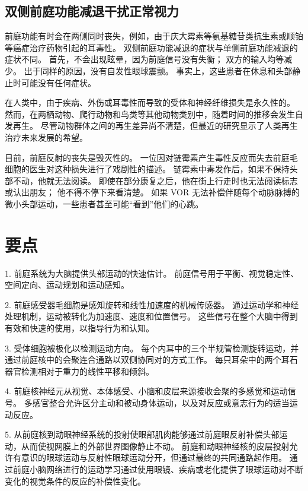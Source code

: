 \subsection{双侧前庭功能减退干扰正常视力}

前庭功能有时会在两侧同时丧失，例如，由于庆大霉素等氨基糖苷类抗生素或顺铂等癌症治疗药物引起的耳毒性。 双侧前庭功能减退的症状与单侧前庭功能减退的症状不同。 首先，不会出现眩晕，因为前庭信号没有失衡； 双方的输入均等减少。 出于同样的原因，没有自发性眼球震颤。 事实上，这些患者在休息和头部静止时可能没有任何症状。

在人类中，由于疾病、外伤或耳毒性而导致的受体和神经纤维损失是永久性的。 然而，在两栖动物、爬行动物和鸟类等其他动物类别中，随着时间的推移会发生自发再生。 尽管动物群体之间的再生差异尚不清楚，但最近的研究显示了人类再生治疗未来发展的希望。

目前，前庭反射的丧失是毁灭性的。 一位因对链霉素产生毒性反应而失去前庭毛细胞的医生对这种损失进行了戏剧性的描述。 链霉素中毒发作后，如果不保持头部不动，他就无法阅读。 即使在部分康复之后，他在街上行走时也无法阅读标志或认出朋友； 他不得不停下来看清楚。 如果 VOR 无法补偿伴随每个动脉脉搏的微小头部运动，一些患者甚至可能“看到”他们的心跳。

\section{要点}

1. 前庭系统为大脑提供头部运动的快速估计。 前庭信号用于平衡、视觉稳定性、空间定向、运动规划和运动感知。 

2. 前庭感受器毛细胞是感知旋转和线性加速度的机械传感器。 通过运动学和神经处理机制，运动被转化为加速度、速度和位置信号。 这些信号在整个大脑中得到有效和快速的使用，以指导行为和认知。 

3. 受体细胞被极化以检测运动方向。 每个内耳中的三个半规管检测旋转运动，并通过前庭核中的会聚连合通路以双侧协同对的方式工作。 每只耳朵中的两个耳石器官检测相对于重力的线性平移和倾斜。 

4. 前庭核神经元从视觉、本体感受、小脑和皮层来源接收会聚的多感觉和运动信号。 多感官整合允许区分主动和被动身体运动，以及对反应或意志行为的适当运动反应。 

5. 从前庭核到动眼神经系统的投射使眼部肌肉能够通过前庭眼反射补偿头部运动，从而使视网膜上的外部世界图像静止不动。 前庭和动眼神经核的皮层投射允许有意识的眼球运动与反射性眼球运动分开，但通过最终的共同通路起作用。 通过前庭小脑网络进行的运动学习通过使用眼镜、疾病或老化提供了眼球运动对不断变化的视觉条件的反应的补偿性变化。 

